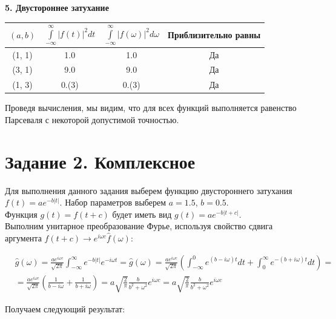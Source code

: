 \documentclass[a4paper,12pt]{article}
\begin{document}
\textbf{5. Двустороннее затухание}\\
\begin{center}
\begin{tabular}{|c|c|c|c|}
    \hline
     $(a, b)$& $\int\limits_{-\infty}^{\infty} |f(t)|^2 dt$ & $\int\limits_{-\infty}^{\infty}|f(\omega)|^2d\omega$ & Приблизительно равны\\
     \hline
     (1, 1)& 1.0 & 1.0& Да \\
      \hline
      (3, 1)&9.0 & 9.0& Да \\
      \hline
        (1, 3)& 0.(3)& 0.(3) & Да\\
        \hline

\end{tabular}
\end{center}

Проведя вычисления, мы видим, что для всех функций выполняется равенство Парсеваля с некоторой допустимой точностью.

\newpage
\section{Задание 2. Комплексное}

Для выполнения данного задания выберем функцию двустороннего затухания $f(t) = ae^{-b|t|}$. Набор параметров выберем $a=1.5$, $b=0.5$.\\

Функция $g(t) = f(t + c)$ будет иметь вид $g(t) = ae^{-b|t+c|}$.\\

Выполним унитарное преобразование Фурье, используя свойство сдвига аргумента $f(t+c) \rightarrow e^{i\omega c}\hat{f}(\omega)$:

\begin{equation*}
    \begin{split}
    &\hat{g}(\omega) = \frac{a e^{i\omega c}}{\sqrt{2\pi}} \int_{-\infty}^{\infty} e^{-b|t|} e^{-i\omega t} = \hat{g}(\omega) = \frac{a e^{i\omega c}}{\sqrt{2\pi}} \left( \int_{-\infty}^{0} e^{(b-i\omega)t} dt + \int_{0}^{\infty} e^{-(b+i\omega)t} dt \right) =\\
    & = \frac{a e^{i\omega c}}{\sqrt{2\pi}} \left( \frac{1}{b-i\omega} + \frac{1}{b+i\omega} \right) = a \sqrt{\frac{2}{\pi}} \frac{b}{b^2 + \omega^2} e^{i\omega c} = a \sqrt{\frac{2}{\pi}} \frac{b}{b^2 + \omega^2} e^{i\omega c}
    \end{split}
\end{equation*}

Получаем следующий результат:\\
\end{document}
